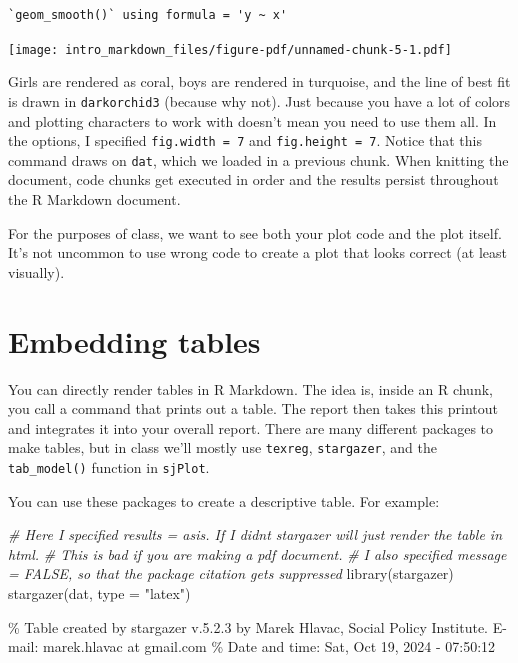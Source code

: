 \documentclass[
  letterpaper,
  DIV=11,
  numbers=noendperiod]{scrreprt}
\newenvironment{Shaded}{}{}
\newcommand{\AttributeTok}[1]{\textcolor[rgb]{0.49,0.56,0.16}{#1}}
\newcommand{\CommentTok}[1]{\textcolor[rgb]{0.38,0.63,0.69}{\textit{#1}}}
\newcommand{\FunctionTok}[1]{\textcolor[rgb]{0.02,0.16,0.49}{#1}}
\newcommand{\NormalTok}[1]{#1}
\newcommand{\StringTok}[1]{\textcolor[rgb]{0.25,0.44,0.63}{#1}}
\begin{document}
\begin{verbatim}
`geom_smooth()` using formula = 'y ~ x'
\end{verbatim}

\texttt{[image: intro\_markdown\_files/figure-pdf/unnamed-chunk-5-1.pdf]}

Girls are rendered as coral, boys are rendered in turquoise, and the
line of best fit is drawn in \texttt{darkorchid3} (because why not).
Just because you have a lot of colors and plotting characters to work
with doesn't mean you need to use them all. In the options, I specified
\texttt{fig.width\ =\ 7} and \texttt{fig.height\ =\ 7}. Notice that this
command draws on \texttt{dat}, which we loaded in a previous chunk. When
knitting the document, code chunks get executed in order and the results
persist throughout the R Markdown document.

For the purposes of class, we want to see both your plot code and the
plot itself. It's not uncommon to use wrong code to create a plot that
looks correct (at least visually).

\section{Embedding tables}\label{embedding-tables}

You can directly render tables in R Markdown. The idea is, inside an R
chunk, you call a command that prints out a table. The report then takes
this printout and integrates it into your overall report. There are many
different packages to make tables, but in class we'll mostly use
\texttt{texreg}, \texttt{stargazer}, and the \texttt{tab\_model()}
function in \texttt{sjPlot}.

You can use these packages to create a descriptive table. For example:

\begin{Shaded}
\begin{Highlighting}[]
\CommentTok{\# Here I specified results = asis. If I didn\textquotesingle{}t stargazer will just render the table in html.}
\CommentTok{\# This is bad if you are making a pdf document.}
\CommentTok{\# I also specified message = FALSE, so that the package citation gets suppressed}
\FunctionTok{library}\NormalTok{(stargazer)}
\FunctionTok{stargazer}\NormalTok{(dat, }\AttributeTok{type =} \StringTok{"latex"}\NormalTok{)}
\end{Highlighting}
\end{Shaded}

\% Table created by stargazer v.5.2.3 by Marek Hlavac, Social Policy
Institute. E-mail: marek.hlavac at gmail.com \% Date and time: Sat, Oct
19, 2024 - 07:50:12
\end{document}
